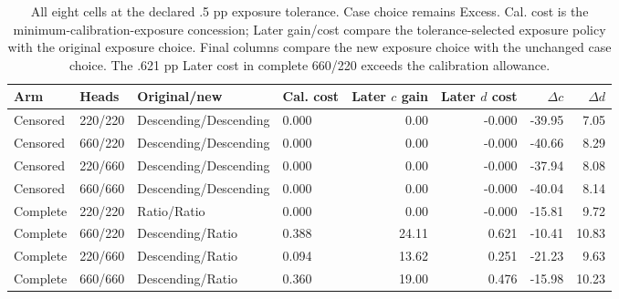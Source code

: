 \begin{table}[t]\centering\scriptsize
\caption{All eight cells at the declared .5 pp exposure tolerance. Case choice remains Excess. Cal. cost is the minimum-calibration-exposure concession; Later gain/cost compare the tolerance-selected exposure policy with the original exposure choice. Final columns compare the new exposure choice with the unchanged case choice. The .621 pp Later cost in complete 660/220 exceeds the calibration allowance.}\label{tab:v8-tolerance}
\begin{tabular}{llllrrrr}\toprule
Arm & Heads & Original/new & Cal. cost & Later $c$ gain & Later $d$ cost & $\Delta c$ & $\Delta d$\\\midrule
Censored & 220/220 & Descending/Descending & 0.000 & 0.00 & -0.000 & -39.95 & 7.05 \\
Censored & 660/220 & Descending/Descending & 0.000 & 0.00 & -0.000 & -40.66 & 8.29 \\
Censored & 220/660 & Descending/Descending & 0.000 & 0.00 & -0.000 & -37.94 & 8.08 \\
Censored & 660/660 & Descending/Descending & 0.000 & 0.00 & -0.000 & -40.04 & 8.14 \\
Complete & 220/220 & Ratio/Ratio & 0.000 & 0.00 & -0.000 & -15.81 & 9.72 \\
Complete & 660/220 & Descending/Ratio & 0.388 & 24.11 & 0.621 & -10.41 & 10.83 \\
Complete & 220/660 & Descending/Ratio & 0.094 & 13.62 & 0.251 & -21.23 & 9.63 \\
Complete & 660/660 & Descending/Ratio & 0.360 & 19.00 & 0.476 & -15.98 & 10.23 \\
\bottomrule\end{tabular}\end{table}
